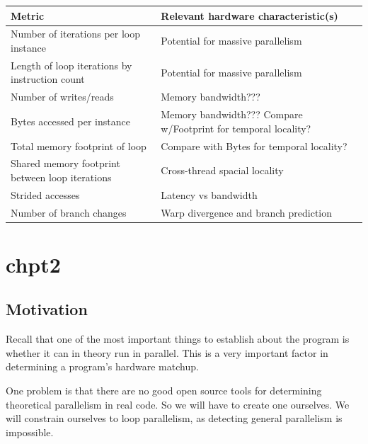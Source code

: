 \documentclass[12pt,twoside]{reedthesis}
\begin{document}
		\begin{table}
		\begin{tabular}{ |p{5.5cm}|p{8cm}| }
			\hline
			Metric & Relevant hardware characteristic(s) \\
			\hline \hline
			Number of iterations per loop instance & Potential for massive parallelism \\
			\hline
			Length of loop iterations by instruction count & Potential for massive parallelism \\
			\hline
			Number of writes/reads & Memory bandwidth??? \\
			\hline
			Bytes accessed per instance & Memory bandwidth??? Compare w/Footprint for temporal locality? \\
			\hline
			Total memory footprint of loop & Compare with Bytes for temporal locality?  \\
			\hline
			Shared memory footprint between loop iterations & Cross-thread spacial locality \\
			\hline
			Strided accesses  & Latency vs bandwidth \\
			\hline
			Number of branch changes & Warp divergence and branch prediction \\
			\hline
		\end{tabular}
	\end{table}
	
	
\chapter{chpt2}
		
		
			
	\section{Motivation}
	
		Recall that one of the most important things to establish about the program is whether it can in theory run in parallel. This is a very important factor in determining a program's hardware matchup.

		One problem is that there are no good open source tools for determining theoretical parallelism in real code. So we will have to create one ourselves. We will constrain ourselves to loop parallelism, as detecting general parallelism is impossible. 
		
\end{document}
